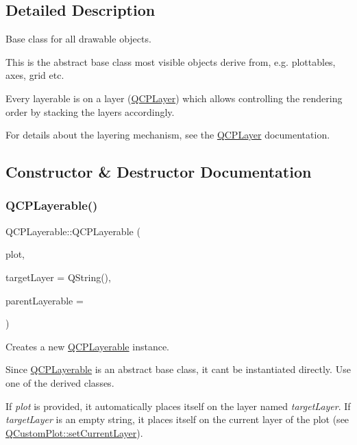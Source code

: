 \subsection{Detailed Description}
Base class for all drawable objects. 

This is the abstract base class most visible objects derive from, e.\+g. plottables, axes, grid etc.

Every layerable is on a layer (\hyperlink{class_q_c_p_layer}{Q\+C\+P\+Layer}) which allows controlling the rendering order by stacking the layers accordingly.

For details about the layering mechanism, see the \hyperlink{class_q_c_p_layer}{Q\+C\+P\+Layer} documentation. 

\subsection{Constructor \& Destructor Documentation}
\mbox{\label{class_q_c_p_layerable_a74c0fa237f29bf0e49565013fc5d1ec0}} 
\subsubsection{\texorpdfstring{Q\+C\+P\+Layerable()}{QCPLayerable()}}
{\footnotesize\ttfamily Q\+C\+P\+Layerable\+::\+Q\+C\+P\+Layerable (\begin{DoxyParamCaption}\item[{\hyperlink{class_q_custom_plot}{Q\+Custom\+Plot} $\ast$}]{plot,  }\item[{Q\+String}]{target\+Layer = {\ttfamily QString()},  }\item[{\hyperlink{class_q_c_p_layerable}{Q\+C\+P\+Layerable} $\ast$}]{parent\+Layerable = {} }\end{DoxyParamCaption})}

Creates a new \hyperlink{class_q_c_p_layerable}{Q\+C\+P\+Layerable} instance.

Since \hyperlink{class_q_c_p_layerable}{Q\+C\+P\+Layerable} is an abstract base class, it can\textquotesingle{}t be instantiated directly. Use one of the derived classes.

If {\itshape plot} is provided, it automatically places itself on the layer named {\itshape target\+Layer}. If {\itshape target\+Layer} is an empty string, it places itself on the current layer of the plot (see \hyperlink{class_q_custom_plot_a73a6dc47c653bb6f8f030abca5a11852}{Q\+Custom\+Plot\+::set\+Current\+Layer}).

